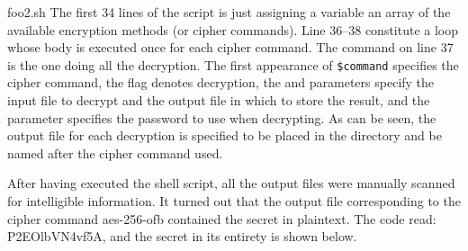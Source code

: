 
                {foo2.sh}
The first 34 lines of the script is just assigning a variable an array of the available encryption methods (or cipher commands). Line 36--38 constitute a loop whose body is executed once for each cipher command. The command on line 37 is the one doing all the decryption. The first appearance of \verb|$command| specifies the cipher command, the  flag denotes decryption, the  and  parameters specify the input file to decrypt and the output file in which to store the result, and the  parameter specifies the password to use when decrypting. As can be seen, the output file for each decryption is specified to be placed in the directory  and be named after the cipher command used.

After having executed the shell script, all the output files were manually scanned for intelligible information. It turned out that the output file corresponding to the cipher command aes-256-ofb contained the secret in plaintext. The code read: P2EOlbVN4vf5A, and the secret in its entirety is shown below.






